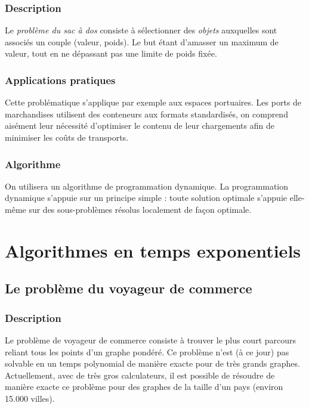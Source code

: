         \subsubsection{Description}
            Le \emph{problème du sac à dos} consiste à sélectionner
            des \emph{objets} auxquelles sont associés un couple (valeur, poids).
            Le but étant d'amasser un maximum de valeur, tout en ne dépassant
            pas une limite de poids fixée.
        \subsubsection{Applications pratiques}
            Cette problématique s'applique par exemple aux espaces portuaires.
            Les ports de marchandises utilisent des conteneurs aux formats standardisés,
            on comprend aisément leur nécessité d'optimiser le contenu de leur
            chargements afin de minimiser les coûts de transports.
        \subsubsection{Algorithme}
            On utilisera un algorithme de programmation dynamique. La programmation dynamique s'appuie sur un principe simple :
	    toute solution optimale s'appuie elle-même sur des sous-problèmes résolus localement de façon optimale.



\section{Algorithmes en temps exponentiels}
     \subsection{Le problème du voyageur de commerce}
        \subsubsection{Description}
                Le problème de voyageur de commerce consiste à trouver le plus
                court parcours reliant tous les points d'un graphe pondéré.
                Ce problème n'est (à ce jour) pas solvable en un temps
                polynomial de manière exacte pour de très grands graphes.
                Actuellement, avec de très gros calculateurs, il est possible
                de résoudre de manière exacte ce problème pour des graphes
                de la taille d'un pays (environ 15.000 villes).

